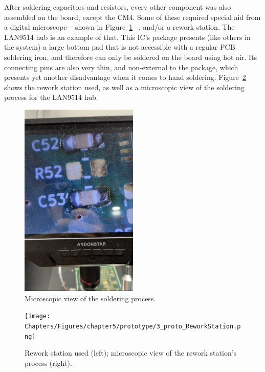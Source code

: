 After soldering capacitors and resistors, every other component was also assembled on the board, except the CM4. Some of these required special aid from a digital microscope -- shown in Figure~\ref{fig:3_proto_Microscope_Capacitors} --, and/or a rework station. The LAN9514 hub is an example of that. This IC's package presents (like others in the system) a large bottom pad that is not accessible with a regular PCB soldering iron, and therefore can only be soldered on the board using hot air. Its connecting pins are also very thin, and non-external to the package, which presents yet another disadvantage when it comes to hand soldering. Figure~\ref{fig:3_proto_ReworkStation} shows the rework station used, as well as a microscopic view of the soldering process for the LAN9514 hub.

\begin{figure}[h]
	\centering
	\includegraphics[width=0.5\textwidth]{Chapters/Figures/chapter5/prototype/3_proto_Microscope_Capacitors.png}
	\caption{Microscopic view of the soldering process.}
	\label{fig:3_proto_Microscope_Capacitors}
\end{figure}%

\begin{figure}[h]
	\centering
	\texttt{[image: Chapters/Figures/chapter5/prototype/3\_proto\_ReworkStation.png]}
	\caption{Rework station used (left); microscopic view of the rework station's process (right).}
	\label{fig:3_proto_ReworkStation}
\end{figure}%

